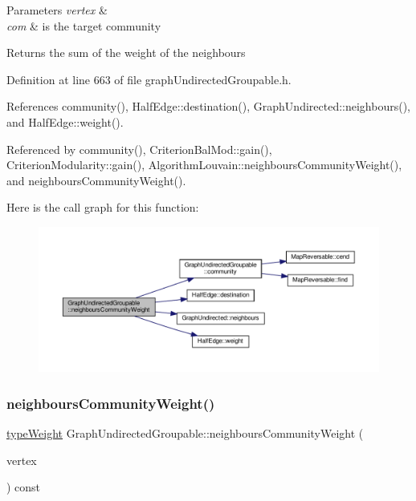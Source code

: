 \begin{DoxyParams}{Parameters}
{\em vertex} & \\
\hline
{\em com} & is the target community \\
\hline
\end{DoxyParams}
\begin{DoxyReturn}{Returns}
the sum of the weight of the neighbours 
\end{DoxyReturn}


Definition at line 663 of file graph\+Undirected\+Groupable.\+h.



References community(), Half\+Edge\+::destination(), Graph\+Undirected\+::neighbours(), and Half\+Edge\+::weight().



Referenced by community(), Criterion\+Bal\+Mod\+::gain(), Criterion\+Modularity\+::gain(), Algorithm\+Louvain\+::neighbours\+Community\+Weight(), and neighbours\+Community\+Weight().

Here is the call graph for this function\+:
\nopagebreak
\begin{figure}[H]
\begin{center}
\leavevmode
\includegraphics[width=350pt]{classGraphUndirectedGroupable_a23551b49c2cbf1b533e300af5c1f20da_cgraph}
\end{center}
\end{figure}
\mbox{\label{classGraphUndirectedGroupable_a41c4955a6238924a861fe18e8d7a9ee9}} 
\subsubsection{\texorpdfstring{neighbours\+Community\+Weight()}{neighboursCommunityWeight()}\hspace{0.1cm}{\footnotesize\ttfamily [2/2]}}
{\footnotesize\ttfamily \hyperlink{edge_8h_a2e7ea3be891ac8b52f749ec73fee6dd2}{type\+Weight} Graph\+Undirected\+Groupable\+::neighbours\+Community\+Weight (\begin{DoxyParamCaption}\item[{const \hyperlink{edge_8h_a5fbd20c46956d479cb10afc9855223f6}{type\+Vertex} \&}]{vertex }\end{DoxyParamCaption}) const\hspace{0.3cm}{\ttfamily [inline]}}


